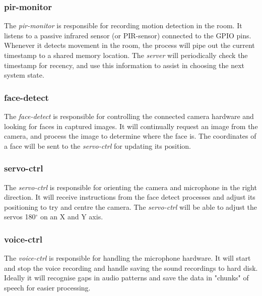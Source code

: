 \documentclass[11pt,a4paper,titlepage]{report}
\begin{document}
\subsubsection{pir-monitor}

The \textit{pir-monitor} is responsible for recording motion detection in the room. It listens to a passive infrared sensor (or PIR-sensor) connected to the GPIO pins. Whenever it detects movement in the room, the process will pipe out the current timestamp to a shared memory location. The \textit{server} will periodically check the timestamp for recency, and use this information to assist in choosing the next system state.


\subsubsection{face-detect}

The \textit{face-detect} is responsible for controlling the connected camera hardware and looking for faces in captured images. It will continually request an image from the camera, and process the image to determine where the face is. The coordinates of a face will be sent to the \textit{servo-ctrl} for updating its position.


\subsubsection{servo-ctrl}

The \textit{servo-ctrl} is responsible for orienting the camera and microphone in the right direction. It will receive instructions from the face detect processes and adjust its positioning to try and centre the camera. The \textit{servo-ctrl} will be able to adjust the servos 180$^\circ$ on an X and Y axis.


\subsubsection{voice-ctrl}

The \textit{voice-ctrl} is responsible for handling the microphone hardware. It will start and stop the voice recording and handle saving the sound recordings to hard disk. Ideally it will recognise gaps in audio patterns and save the data in "chunks" of speech for easier processing. 
\end{document}
